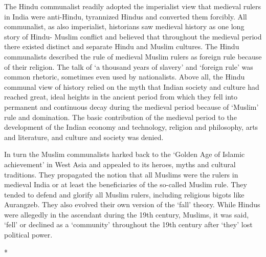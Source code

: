\begin{multicols}{2}
The Hindu communalist readily adopted the imperialist view that medieval rulers in India were anti-Hindu, tyrannized Hindus and converted them forcibly. All communalist, as also imperialist, historians saw medieval history as one long story of Hindu- Muslim conflict and believed that throughout the medieval period there existed distinct and separate Hindu and Muslim cultures. The Hindu communalists described the rule of medieval Muslim rulers as foreign rule because of their religion. The talk of `a thousand years of slavery' and `foreign rule' was common rhetoric, sometimes even used by nationalists. Above all, the Hindu communal view of history relied on the myth that Indian society and culture had reached great, ideal heights in the ancient period from which they fell into permanent and continuous decay during the medieval period because of `Muslim' rule and domination. The basic contribution of the medieval period to the development of the Indian economy and technology, religion and philosophy, arts and literature, and culture and society was denied. 

In turn the Muslim communalists harked back to the `Golden Age of Islamic achievement' in West Asia and appealed to its heroes, myths and cultural traditions. They propagated the notion that all Muslims were the rulers in medieval India or at least the beneficiaries of the so-called Muslim rule. They tended to defend and glorify all Muslim rulers, including religious bigots like Aurangzeb. They also evolved their own version of the `fall' theory. While Hindus were allegedly in the ascendant during the 19th century, Muslims, it was said, `fell' or declined as a `community' throughout the 19th century after `they' lost political power.

\begin{center}*\end{center}

\paragraph*{}


\end{multicols}
